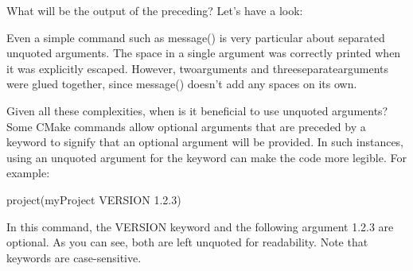 

What will be the output of the preceding? Let’s have a look:


Even a simple command such as message() is very particular about separated unquoted arguments. The space in a single argument was correctly printed when it was explicitly escaped.
However, twoarguments and threeseparatearguments were glued together, since message() doesn’t add any spaces on its own.

Given all these complexities, when is it beneficial to use unquoted arguments? Some CMake commands allow optional arguments that are preceded by a keyword to signify that an optional argument will be provided. In such instances, using an unquoted argument for the keyword can make the code more legible. For example:

\begin{cmake}
project(myProject VERSION 1.2.3)
\end{cmake}

In this command, the VERSION keyword and the following argument 1.2.3 are optional. As you can see, both are left unquoted for readability. Note that keywords are case-sensitive.

